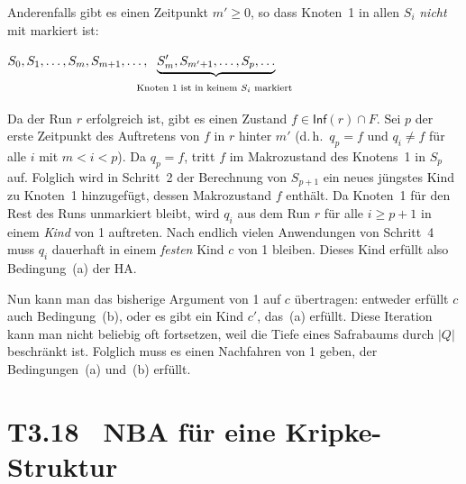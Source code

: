 \documentclass[fontsize=11pt, twoside=false, numbers=autoenddot]{scrbook}
\begin{document}
Anderenfalls gibt es einen Zeitpunkt $m' \geq 0$, %
so dass Knoten~1 in allen $S_i$ \emph{nicht} mit \circled{!} markiert ist:
%
\begin{center}
  $S_0,S_1,\dots,S_m,S_{m+1},\dots,\!\!\!\!\!\!\underbrace{S_m',S_{m'+1},\dots,S_p,\dots}_{%
    \text{%
      \begin{tabular}{@{}l@{}}
        Knoten 1 ist in keinem $S_i$ markiert %
      \end{tabular}
    }
  }$
\end{center}
%
Da der Run $r$ erfolgreich ist, gibt es einen Zustand $f \in \textsf{Inf}(r) \cap F$.
Sei $p$ der erste Zeitpunkt des Auftretens von $f$ in $r$ hinter $m'$
(d.\,h.\ $q_p = f$ und $q_i \neq f$ für alle $i$ mit $m < i < p$).
Da $q_p = f$, tritt $f$ im Makrozustand des Knotens~1 in $S_p$ auf.
Folglich wird in Schritt~2 der Berechnung von $S_{p+1}$ ein neues jüngstes Kind
zu Knoten~1 hinzugefügt, dessen Makrozustand $f$ enthält.
Da Knoten~1 für den Rest des Runs unmarkiert bleibt,
wird $q_i$ aus dem Run $r$ für alle $i \geq p+1$ in einem \emph{Kind} von 1 auftreten.
Nach endlich vielen Anwendungen von Schritt~4 muss $q_i$ dauerhaft
in einem \emph{festen} Kind $c$ von 1 bleiben.
Dieses Kind erfüllt also Bedingung~(a) der HA.

Nun kann man das bisherige Argument von 1 auf $c$ übertragen:
entweder erfüllt $c$ auch Bedingung~(b),
oder es gibt ein Kind $c'$, das~(a) erfüllt.
Diese Iteration kann man nicht beliebig oft fortsetzen,
weil die Tiefe eines Safrabaums durch $|Q|$ beschränkt ist.
Folglich muss es einen Nachfahren von 1 geben, der Bedingungen~(a)
und~(b) erfüllt.
\qedhere

\section*{T3.18~ NBA für eine Kripke-Struktur}
\end{document}
